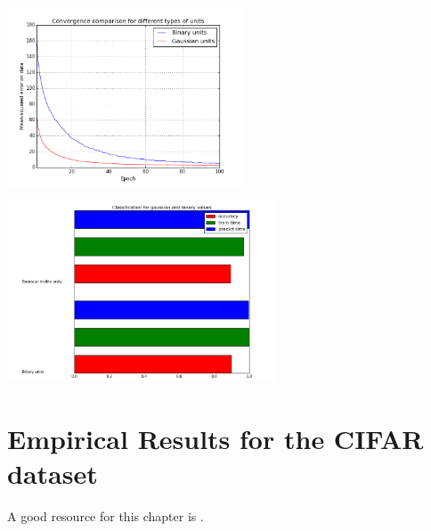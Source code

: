 \documentclass[a4paper]{scrartcl}
\begin{document}
\begin{minipage}[t]{0.5\textwidth}

\includegraphics[width=7cm]{images/dataTypes.png}

\end{minipage}
\begin{minipage}[t]{0.5\textwidth}

\includegraphics[width=8cm]{images/gaussian_binary.png}

\end{minipage}


\newpage


\section{Empirical Results for the CIFAR dataset}
A good resource for this chapter is \cite{cifarpaper}.
\end{document}
